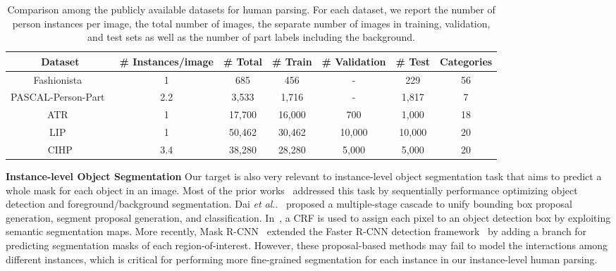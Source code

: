 \documentclass[runningheads]{llncs}
\makeatletter
\DeclareRobustCommand\onedot{\futurelet\@let@token\@onedot}
\def\@onedot{\ifx\@let@token.\else.\null\fi\xspace}
\def\etal{\emph{et al}\onedot}
\makeatother
\begin{document}
\begin{table}[t]
\centering
\scriptsize
\caption{Comparison among the publicly available datasets for human parsing. For each dataset, we report the number of person instances per image, the total number of images, the separate number of images in training, validation, and test sets as well as the number of part labels including the background.}
\tabcolsep 0.02in
\begin{tabular}{ccccccc}
\toprule[0.7pt]
    Dataset                                  & \# Instances/image  & \# Total & \# Train  & \# Validation & \# Test   & Categories \\ \hline
    Fashionista~\cite{yamaguchi2012parsing}  &     1               & 685      &  456      &         -      &    229    & 56         \\
    PASCAL-Person-Part~\cite{chen2014detect} &     2.2             & 3,533    &  1,716    &         -      &    1,817  & 7          \\
    ATR~\cite{Co-CNN}                        &     1               & 17,700   &  16,000   &        700     &    1,000  & 18         \\
    LIP~\cite{Gong_2017_CVPR}                &     1               & 50,462   &  30,462   &        10,000  &    10,000 & 20         \\ \hline
    CIHP                                     &     3.4             & 38,280   &  28,280   &        5,000   &    5,000  & 20         \\
\toprule[0.7pt]
\end{tabular}
\vspace{-8mm}
\label{tab:dataset_num}
\end{table}


\textbf{Instance-level Object Segmentation}
Our target is also very relevant to instance-level object segmentation task that aims to predict a whole mask for each object in an image. Most of the prior works~\cite{Dai_2016_CVPR,pinheiro2015learning,hariharan2014simultaneous,liang2016reversible,pinheiro2015learning,He_2017_ICCV} addressed this task by sequentially performance optimizing object detection and foreground/background segmentation. Dai \etal~\cite{Dai_2016_CVPR} proposed a multiple-stage cascade to unify bounding box proposal generation, segment proposal generation, and classification. In~\cite{Arnab_2017_CVPR,li2017holistic}, a CRF is used to assign each pixel to an object detection box by exploiting semantic segmentation maps. More recently, Mask R-CNN~\cite{He_2017_ICCV} extended the Faster R-CNN detection framework~\cite{fasterrcnn} by adding a branch for predicting segmentation masks of each region-of-interest. However, these proposal-based methods may fail to model the interactions among different instances, which is critical for performing more fine-grained segmentation for each instance in our instance-level human parsing.
\end{document}
